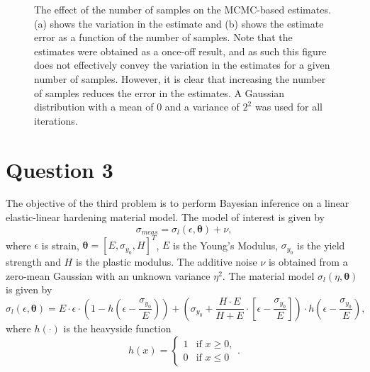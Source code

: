 \documentclass{article}
\begin{document}
\begin{figure}[htb!]
		\caption{The effect of the number of samples on the MCMC-based estimates. (a) shows the variation in the estimate and (b) shows the estimate error as a function of the number of samples. Note that the estimates were obtained as a once-off result, and as such this figure does not effectively convey the variation in the estimates for a given number of samples. However, it is clear that increasing the number of samples reduces the error in the estimates. A Gaussian distribution with a mean of 0 and a variance of $2^2$ was used for all iterations.}
		\label{fig:Q2_estimate_error}
	\end{figure}
	
	\clearpage
	
	\section{Question 3}
	
	The objective of the third problem is to perform Bayesian inference on a linear elastic-linear hardening material model. The model of interest is given by
	\begin{equation}
		\sigma_{meas} = \sigma_l(\epsilon, \boldsymbol\theta) + \nu,
	\end{equation} 
	where $\epsilon$ is strain, $\boldsymbol\theta = [E, \sigma_{y_0}, H]^T$, $E$ is the Young's Modulus, $\sigma_{y_0}$ is the yield strength and $H$ is the plastic modulus. The additive noise $\nu$ is obtained from a zero-mean Gaussian with an unknown variance $\eta^2$. The material model $\sigma_l(\eta, \boldsymbol\theta)$ is given by
	\begin{equation}
		\sigma_l(\epsilon, \boldsymbol\theta) = E \cdot \epsilon \cdot \left( 1 - h(\epsilon - \frac{\sigma_{y_0}}{E}) \right) + \left( \sigma_{y_0} + \frac{H \cdot E}{H + E} \cdot \left[ \epsilon - \frac{\sigma_{y_0}}{E} \right] \right) \cdot h(\epsilon - \frac{\sigma_{y_0}}{E}),
	\end{equation}
	where $h(\cdot)$ is the heavyside function
	\begin{equation}
		h(x) = \begin{cases} 
			1 & \text{if }  x \geq 0, \\
			0 & \text{if } x \leq 0
		\end{cases}.
	\end{equation}
\end{document}

